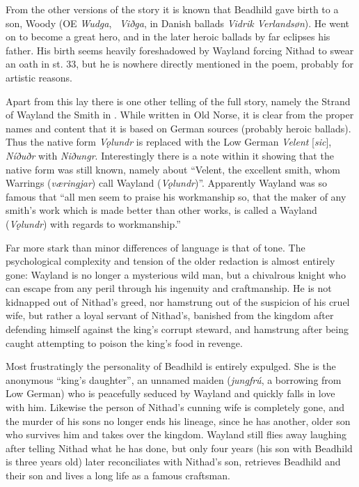 From the other versions of the story it is known that Beadhild gave birth to a son, Woody (OE \emph{Wudga}, \ThidreksSaga\ \emph{Viðga}, in Danish ballads \emph{Vidrik Verlandsøn}). He went on to become a great hero, and in the later heroic ballads by far eclipses his father. His birth seems heavily foreshadowed by Wayland forcing Nithad to swear an oath in st. 33, but he is nowhere directly mentioned in the poem, probably for artistic reasons.

Apart from this lay there is one other telling of the full story, namely the Strand of Wayland the Smith in \ThidreksSaga. While written in Old Norse, it is clear from the proper names and content that it is based on German sources (probably heroic ballads). Thus the native form \emph{Vǫlundr} is replaced with the Low German \emph{Velent} [\emph{sic}], \emph{Níðuðr} with \emph{Niðungr}. Interestingly there is a note within it showing that the native form was still known, namely about “Velent, the excellent smith, whom Warrings (\emph{væringjar}) call Wayland (\emph{Vǫlundr})”. Apparently Wayland was so famous that “all men seem to praise his workmanship so, that the maker of any smith’s work which is made better than other works, is called a Wayland (\emph{Vǫlundr}) with regards to workmanship.”

Far more stark than minor differences of language is that of tone. The psychological complexity and tension of the older redaction is almost entirely gone: Wayland is no longer a mysterious wild man, but a chivalrous knight who can escape from any peril through his ingenuity and craftmanship. He is not kidnapped out of Nithad’s greed, nor hamstrung out of the suspicion of his cruel wife, but rather a loyal servant of Nithad’s, banished from the kingdom after defending himself against the king’s corrupt steward, and hamstrung after being caught attempting to poison the king’s food in revenge.

Most frustratingly the personality of Beadhild is entirely expulged. She is the anonymous “king’s daughter”, an unnamed maiden (\emph{jungfrú}, a borrowing from Low German) who is peacefully seduced by Wayland and quickly falls in love with him. Likewise the person of Nithad’s cunning wife is completely gone, and the murder of his sons no longer ends his lineage, since he has another, older son who survives him and takes over the kingdom. Wayland still flies away laughing after telling Nithad what he has done, but only four years (his son with Beadhild is three years old) later reconciliates with Nithad’s son, retrieves Beadhild and their son and lives a long life as a famous craftsman.

